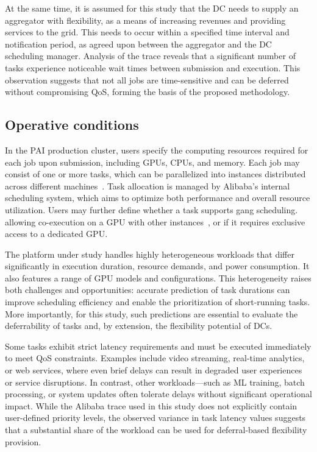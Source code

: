 \documentclass[preprint,12pt]{elsarticle}
\begin{document}
At the same time, it is assumed for this study that the DC needs to supply an aggregator with flexibility, as a means of increasing revenues and providing services to the grid. This needs to occur within a specified time interval and notification period, as agreed upon between the aggregator and the DC scheduling manager. Analysis of the trace reveals that a significant number of tasks experience noticeable wait times between submission and execution. This observation suggests that not all jobs are time-sensitive and can be deferred without compromising QoS, forming the basis of the proposed methodology.

\subsection{Operative conditions}

In the PAI production cluster, users specify the computing resources required for each job upon submission, including GPUs, CPUs, and memory. Each job may consist of one or more tasks, which can be parallelized into instances distributed across different machines~\cite{Weng2022}. Task allocation is managed by Alibaba’s internal scheduling system, which aims to optimize both performance and overall resource utilization. Users may further define whether a task supports gang scheduling. allowing co-execution on a GPU with other instances~\cite{antMan}, or if it requires exclusive access to a dedicated GPU.

The platform under study handles highly heterogeneous workloads that differ significantly in execution duration, resource demands, and power consumption. It also features a range of GPU models and configurations. This heterogeneity raises both challenges and opportunities: accurate prediction of task durations can improve scheduling efficiency and enable the prioritization of short-running tasks. More importantly, for this study, such predictions are essential to evaluate the deferrability of tasks and, by extension, the flexibility potential of DCs.

Some tasks exhibit strict latency requirements and must be executed immediately to meet QoS constraints. Examples include video streaming, real-time analytics, or web services, where even brief delays can result in degraded user experiences or service disruptions. In contrast, other workloads—such as ML training, batch processing, or system updates often tolerate delays without significant operational impact. While the Alibaba trace used in this study does not explicitly contain user-defined priority levels, the observed variance in task latency values suggests that a substantial share of the workload can be used for deferral-based flexibility provision.
\end{document}
